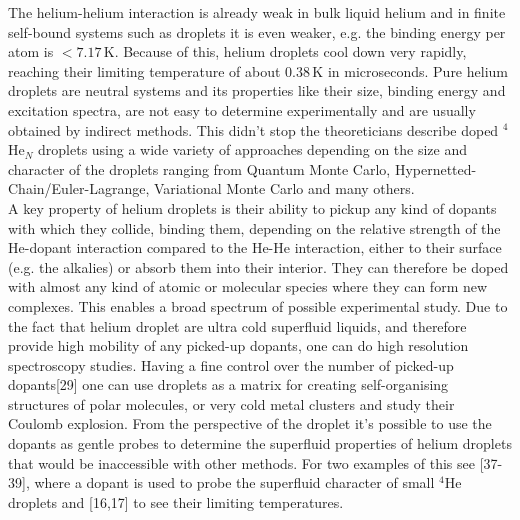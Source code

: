\documentclass[11pt,a4paper,twoside]{article}
\newcommand{\unit}[1]{\,\mathrm{#1}}
\begin{document}
		The helium-helium interaction is already weak in bulk liquid helium and in finite self-bound systems such as droplets it is even weaker, e.g. the binding energy per atom is $<\!7.17\unit{K}$. Because of this, helium droplets cool down very rapidly, reaching their limiting temperature of about $0.38\unit{K}$ in microseconds. Pure helium droplets are neutral systems and its properties like their size, binding energy and excitation spectra, are not easy to determine experimentally and are usually obtained by indirect methods. This didn't stop the theoreticians describe doped $^4$He$_N$ droplets using a wide variety of approaches depending on the size and character of the droplets ranging from Quantum Monte Carlo, Hypernetted-Chain/Euler-Lagrange, Variational Monte Carlo and many others.\\
	
		A key property of helium droplets is their ability to pickup any kind of dopants with which they collide, binding them, depending on the relative strength of the He-dopant interaction compared to the He-He interaction, either to their surface (e.g. the alkalies) or absorb them into their interior. They can therefore be doped with almost any kind of atomic or molecular species where they can form new complexes. This enables a broad spectrum of possible experimental study. Due to the fact that helium droplet are ultra cold superfluid liquids, and therefore provide high mobility of any picked-up dopants, one can do high resolution spectroscopy studies. Having a fine control over the number of picked-up dopants[29] one can use droplets as a matrix for creating self-organising structures of polar molecules, or very cold metal clusters and study their Coulomb explosion. From the perspective of the droplet it's possible to use the dopants as gentle probes to determine the superfluid properties of helium droplets that would be inaccessible with other methods. For two examples of this see [37-39], where a dopant is used to probe the superfluid character of small $^4$He droplets and [16,17] to see their limiting temperatures.\\
		
\end{document}
